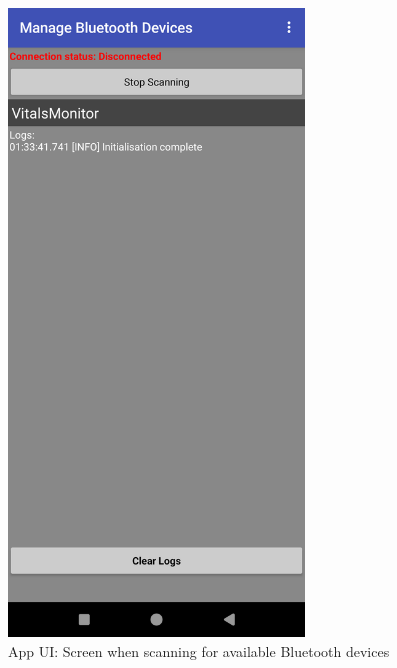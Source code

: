 \newpage
\begin{figure}[H]
	\centering
	\includegraphics[width=0.7\textwidth]{images/app_ui_main_scanning}
	\caption{App UI: Screen when scanning for available Bluetooth devices}
	\label{appendix:app_ui_scanning}
\end{figure}

